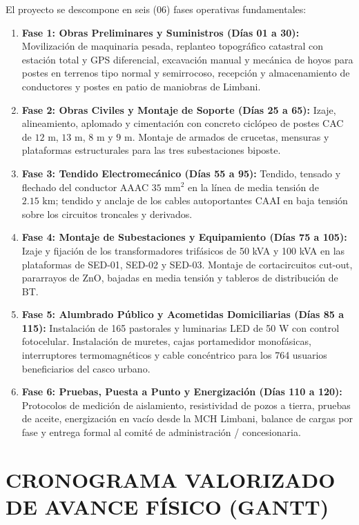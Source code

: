 El proyecto se descompone en seis (06) fases operativas fundamentales:
\begin{enumerate}
  \item \textbf{Fase 1: Obras Preliminares y Suministros (Días 01 a 30):} Movilización de maquinaria pesada, replanteo topográfico catastral con estación total y GPS diferencial, excavación manual y mecánica de hoyos para postes en terrenos tipo normal y semirrocoso, recepción y almacenamiento de conductores y postes en patio de maniobras de Limbani.
  \item \textbf{Fase 2: Obras Civiles y Montaje de Soporte (Días 25 a 65):} Izaje, alineamiento, aplomado y cimentación con concreto ciclópeo de postes CAC de $12\text{ m}$, $13\text{ m}$, $8\text{ m}$ y $9\text{ m}$. Montaje de armados de crucetas, mensuras y plataformas estructurales para las tres subestaciones biposte.
  \item \textbf{Fase 3: Tendido Electromecánico (Días 55 a 95):} Tendido, tensado y flechado del conductor AAAC $35\text{ mm}^2$ en la línea de media tensión de $2.15\text{ km}$; tendido y anclaje de los cables autoportantes CAAI en baja tensión sobre los circuitos troncales y derivados.
  \item \textbf{Fase 4: Montaje de Subestaciones y Equipamiento (Días 75 a 105):} Izaje y fijación de los transformadores trifásicos de 50 kVA y 100 kVA en las plataformas de SED-01, SED-02 y SED-03. Montaje de cortacircuitos cut-out, pararrayos de ZnO, bajadas en media tensión y tableros de distribución de BT.
  \item \textbf{Fase 5: Alumbrado Público y Acometidas Domiciliarias (Días 85 a 115):} Instalación de 165 pastorales y luminarias LED de 50 W con control fotocelular. Instalación de muretes, cajas portamedidor monofásicas, interruptores termomagnéticos y cable concéntrico para los 764 usuarios beneficiarios del casco urbano.
  \item \textbf{Fase 6: Pruebas, Puesta a Punto y Energización (Días 110 a 120):} Protocolos de medición de aislamiento, resistividad de pozos a tierra, pruebas de aceite, energización en vacío desde la MCH Limbani, balance de cargas por fase y entrega formal al comité de administración / concesionaria.
\end{enumerate}

\section{CRONOGRAMA VALORIZADO DE AVANCE FÍSICO (GANTT)}

